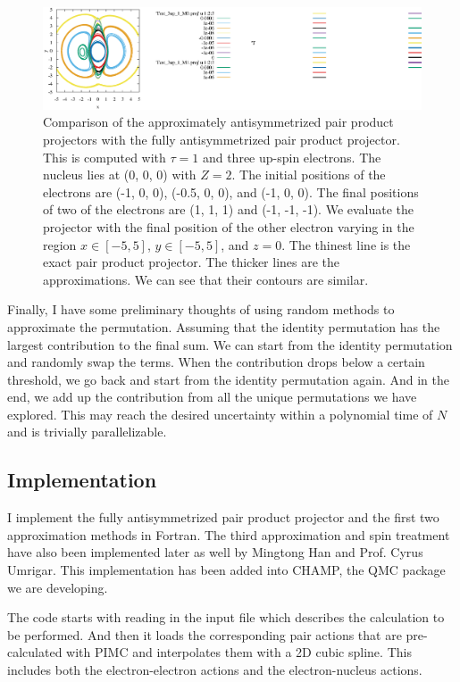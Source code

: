 \documentclass[%
reprint,
nofootinbib,
amsmath,amssymb,
aps,
prl,
]{revtex4-1}
\begin{document}
\begin{figure}
\includegraphics[scale=0.8,clip,trim=0 0 23cm 0]{Test_3up_1=1_mod}%
\caption{\label{fig:comp}
Comparison of the approximately antisymmetrized pair product projectors with the fully antisymmetrized pair product projector.
This is computed with $\tau = 1$ and three up-spin electrons.
The nucleus lies at (0, 0, 0) with $Z=2$.
The initial positions of the electrons are (-1, 0, 0), (-0.5, 0, 0), and (-1, 0, 0).
The final positions of two of the electrons are (1, 1, 1) and (-1, -1, -1).
We evaluate the projector with the final position of the other electron varying in the region $x\in[-5,5]$, $y\in[-5,5]$, and $z = 0$.
The thinest line is the exact pair product projector.
The thicker lines are the approximations.
We can see that their contours are similar.
}
\end{figure}

Finally, I have some preliminary thoughts of using random methods to approximate the permutation.
Assuming that the identity permutation has the largest contribution to the final sum.
We can start from the identity permutation and randomly swap the terms.
When the contribution drops below a certain threshold, we go back and start from the identity permutation again.
And in the end, we add up the contribution from all the unique permutations we have explored.
This may reach the desired uncertainty within a polynomial time of $N$ and is trivially parallelizable.

\subsection{Implementation}

I implement the fully antisymmetrized pair product projector and the first two approximation methods in Fortran.
The third approximation and spin treatment have also been implemented later as well by Mingtong Han and Prof. Cyrus Umrigar.
This implementation has been added into CHAMP, the QMC package we are developing.

The code starts with reading in the input file which describes the calculation to be performed.
And then it loads the corresponding pair actions that are pre-calculated with PIMC and interpolates them with a 2D cubic spline.
This includes both the electron-electron actions and the electron-nucleus actions.
\end{document}
